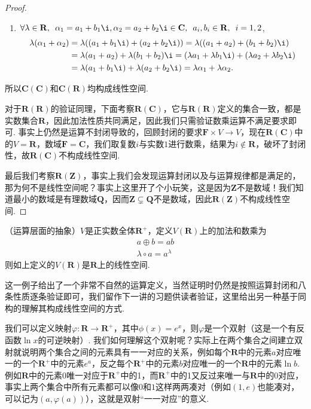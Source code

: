 \begin{proof}
\begin{enumerate}
        \item $\forall \lambda \in \mathbf{R},\enspace \alpha_1 = a_1+b_1\i, \alpha_2 = a_2+b_2\i \in \mathbf{C},\enspace a_i, b_i \in \mathbf{R},\enspace i = 1, 2$,
            \begin{align*}
                \lambda(\alpha_1+\alpha_2)
                    & = \lambda((a_1+b_1\i)+(a_2+b_2\i)) = \lambda((a_1+a_2)+(b_1+b_2)\i)                             \\
                    & = \lambda(a_1+a_2)+\lambda(b_1+b_2)\i = (\lambda a_1+\lambda b_1\i)+(\lambda a_2+\lambda b_2\i) \\
                    & = \lambda(a_1+b_1\i)+\lambda(a_2+b_2\i) = \lambda \alpha_1 + \lambda \alpha_2.
            \end{align*}
    \end{enumerate}
    所以$\mathbf{C}(\mathbf{C})$和$\mathbf{C}(\mathbf{R})$均构成线性空间.

    对于$\mathbf{R(R)}$的验证同理，下面考察$\mathbf{R}(\mathbf{C})$，它与$\mathbf{R(R)}$定义的集合一致，都是实数集合$\mathbf{R}$，因此加法性质共同满足，因此我们只需验证数乘运算不满足要求即可. 事实上仍然是运算不封闭导致的，回顾封闭的要求$\mathbf{F}\times V\to V$，现在$\mathbf{R(C)}$中的$V=\mathbf{R}$，数域$\mathbf{F}=\mathbf{C}$，我们取复数$i$与实数$1$进行数乘，结果为$i\notin\mathbf{R}$，破坏了封闭性，故$\mathbf{R(C)}$不构成线性空间.

    最后我们考察$\mathbf{R(Z)}$，事实上我们会发现运算封闭以及与运算规律都是满足的，那为何不是线性空间呢？事实上这里开了个小玩笑，这是因为$\mathbf{Z}$不是数域！我们知道最小的数域是有理数域$\mathbf{Q}$，因而$\mathbf{Z}\subsetneq\mathbf{Q}$不是数域，因此$\mathbf{R(Z)}$不构成线性空间.
\end{proof}

\begin{example} \label{ex:2:运算与同构}
    （运算层面的抽象）$V$是正实数全体$\mathbf{R}^+$，定义$V(\mathbf{R})$上的加法和数乘为
    \begin{gather*}
        a\oplus b=ab \\
        \lambda\circ a=a^\lambda
    \end{gather*}
    则如上定义的$V(\mathbf{R})$是$\mathbf{R}$上的线性空间.
\end{example}

这一例子给出了一个非常不自然的运算定义，当然证明时仍然是按照运算封闭和八条性质逐条验证即可，我们留作下一讲的习题供读者验证，这里给出另一种基于同构的理解其构成线性空间的方式.

我们可以定义映射$\varphi:\mathbf{R}\to\mathbf{R}^+$，其中$\phi(x)=e^x$，则$\varphi$是一个双射（这是一个有反函数$\ln x$的可逆映射）. 我们如何理解这个双射呢？实际上在两个集合之间建立双射就说明两个集合之间的元素具有一一对应的关系，例如每个$\mathbf{R}$中的元素$a$对应唯一的一个$\mathbf{R}^+$中的元素$e^a$，反之每个$\mathbf{R}^+$中的元素$b$对应唯一的一个$\mathbf{R}$中的元素$\ln b$. 例如$\mathbf{R}$中的元素$0$唯一对应于$\mathbf{R}^+$中的1，而$\mathbf{R}^+$中的1又反过来唯一与$\mathbf{R}$中的$0$对应，事实上两个集合中所有元素都可以像$0$和$1$这样两两凑对（例如$(1,e)$也能凑对，可以记为$(a,\varphi(a))$），这就是双射``一一对应''的意义.

